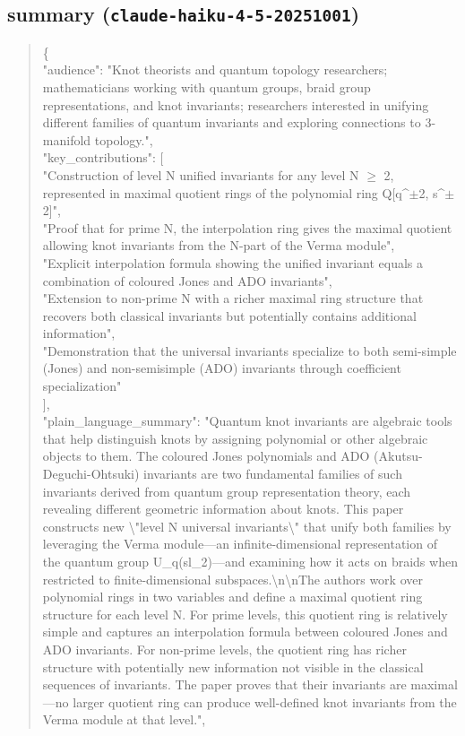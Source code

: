 \documentclass[11pt]{article}
\begin{document}
\subsection*{summary (\texttt{claude-haiku-4-5-20251001})}
\begin{quote}\small\ttfamily\raggedright
\{\\
  "audience": "Knot theorists and quantum topology researchers; mathematicians working with quantum groups, braid group representations, and knot invariants; researchers interested in unifying different families of quantum invariants and exploring connections to 3-manifold topology.",\\
  "key\_contributions": [\\
    "Construction of level N unified invariants for any level N \ensuremath{\ge} 2, represented in maximal quotient rings of the polynomial ring Q[q\^{}\ensuremath{\pm}2, s\^{}\ensuremath{\pm}2]",\\
    "Proof that for prime N, the interpolation ring gives the maximal quotient allowing knot invariants from the N-part of the Verma module",\\
    "Explicit interpolation formula showing the unified invariant equals a combination of coloured Jones and ADO invariants",\\
    "Extension to non-prime N with a richer maximal ring structure that recovers both classical invariants but potentially contains additional information",\\
    "Demonstration that the universal invariants specialize to both semi-simple (Jones) and non-semisimple (ADO) invariants through coefficient specialization"\\
  ],\\
  "plain\_language\_summary": "Quantum knot invariants are algebraic tools that help distinguish knots by assigning polynomial or other algebraic objects to them. The coloured Jones polynomials and ADO (Akutsu-Deguchi-Ohtsuki) invariants are two fundamental families of such invariants derived from quantum group representation theory, each revealing different geometric information about knots. This paper constructs new \textbackslash{}"level N universal invariants\textbackslash{}" that unify both families by leveraging the Verma module---an infinite-dimensional representation of the quantum group U\_q(sl\_2)---and examining how it acts on braids when restricted to finite-dimensional subspaces.\textbackslash{}n\textbackslash{}nThe authors work over polynomial rings in two variables and define a maximal quotient ring structure for each level N. For prime levels, this quotient ring is relatively simple and captures an interpolation formula between coloured Jones and ADO invariants. For non-prime levels, the quotient ring has richer structure with potentially new information not visible in the classical sequences of invariants. The paper proves that their invariants are maximal---no larger quotient ring can produce well-defined knot invariants from the Verma module at that level.",\\

\end{quote}
\end{document}
